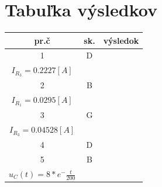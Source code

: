 \documentclass[a4paper,oneside,12pt]{article}
\begin{document}
\newpage

\maketitle
\section{Tabuľka výsledkov}

\begin{table}[h]
	\begin{center}		
		\begin{tabular}{|c|c|c|}
				\hline
				pr.č & sk. & výsledok \\
				\hline
				1 & D & \makecell{$U_{R_{3}} = 73.5019[V]$ \\  $I_{R_{3}} = 0.2227[A]$} \\
				\hline
				2 & B & \makecell{$U_{R_{1}} = 1.4750[V]$ \\ $I_{R_{1}} = 0.0295[A]$} \\
				\hline
				3 & G & \makecell{$U_{R_{3}} = 2.4[V]$ \\ $I_{R_{3}} = 0.04528[A]$} \\
				\hline
				4 & D & \makecell{$!!!TODO!!!$} \\
				\hline
				5 & B & \makecell{$U_{C}' = -\frac{U_{C}}{200}$ \\ $u_{C}(t) = 8 * e^-\frac{t}{200}$} \\
				\hline
		\end{tabular}
	
	\end{center}
\end{table}
\end{document}
